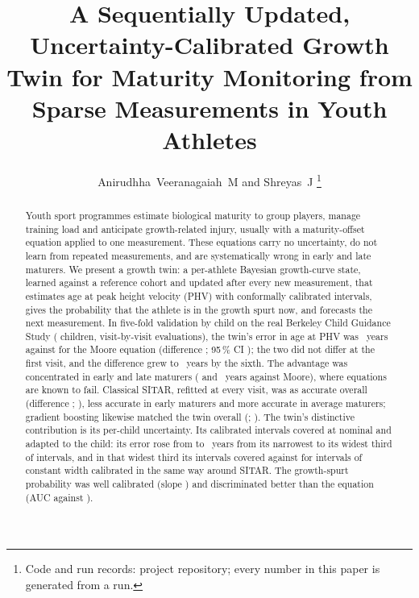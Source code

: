 \documentclass[journal]{IEEEtran}
\begin{document}
\title{A Sequentially Updated, Uncertainty-Calibrated Growth Twin for Maturity Monitoring from Sparse Measurements in Youth Athletes}

\author{Anirudhha~Veeranagaiah~M and Shreyas~J%
\thanks{Code and run records: project repository; every number in this paper is generated from a run.}}


\maketitle

\begin{abstract}
Youth sport programmes estimate biological maturity to group players, manage training load and
anticipate growth-related injury, usually with a maturity-offset equation applied to one
measurement. These equations carry no uncertainty, do not learn from repeated measurements, and
are systematically wrong in early and late maturers. We present a growth twin: a per-athlete
Bayesian growth-curve state, learned against a reference cohort and updated after every new
measurement, that estimates age at peak height velocity (PHV) with conformally calibrated
intervals, gives the probability that the athlete is in the growth spurt now, and forecasts the
next measurement. In five-fold validation by child on the real Berkeley Child Guidance Study
(\TwChildren{} children, \TwEvaluations{} visit-by-visit evaluations), the twin's error in age at
PHV was \TwMAE{}~years against \TwMooreMAE{} for the Moore equation (difference \TwDiffMoore{};
95\,\% CI \TwDiffMooreCI{}); the two did not differ at the first visit, and the difference grew to
\TwDiffMooreLast{}~years by the sixth. The advantage was concentrated in early and late maturers
(\TwEarlyDiffMoore{} and \TwLateDiffMoore{}~years against Moore), where equations are known to
fail. Classical SITAR, refitted at every visit, was as accurate overall (difference
\TwDiffSitar{}; \TwDiffSitarCI{}), less accurate in early maturers and more accurate in average
maturers; gradient boosting likewise matched the twin overall (\TwDiffML{}; \TwDiffMLCI{}). The twin's
distinctive contribution is its per-child uncertainty. Its calibrated intervals covered \TwCovConf{}
at nominal \SpecInterval{} and adapted to the child: its error rose from \ErrNarrow{} to
\ErrWide{}~years from its narrowest to its widest third of intervals, and in that widest third
its intervals covered \CovTwinWide{} against \CovSitarWide{} for intervals of constant width
calibrated in the same way around SITAR. The growth-spurt probability was well
calibrated (slope \CircaSlope{}) and discriminated better than the equation (AUC \TwCircaAUC{}
against \TwCircaAUCMoore{}).
\end{abstract}
\end{document}
